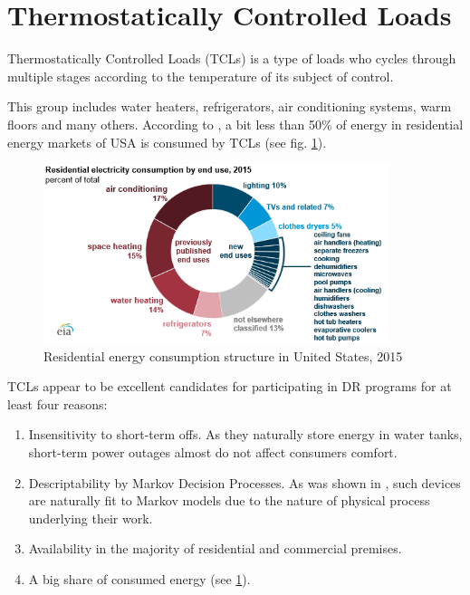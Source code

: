 \section{Thermostatically Controlled Loads}

\begin{definition}
    Thermostatically Controlled Loads (TCLs) is a type of loads who cycles through multiple stages according to the temperature of its subject of control.
\end{definition}
 This group includes water heaters, refrigerators, air conditioning systems, warm floors and many others. According to \cite{EIA2009}, a bit less than 50\% of energy in residential energy markets of USA is consumed by TCLs (see fig. \ref{fig:energy_consumption_in_usa}).

\begin{figure}
    \centering
    \label{fig:energy_consumption_in_usa}
    \includegraphics[width=0.9\textwidth]{figures/energy_consumption_in_usa}
    \caption{Residential energy consumption structure in United States, 2015}
\end{figure}

TCLs appear to be excellent candidates for participating in DR programs for at least four reasons:

\begin{enumerate}
    \item Insensitivity to short-term offs. As they naturally store energy in water tanks, short-term power outages almost do not affect consumers comfort.
    \item Descriptability by Markov Decision Processes. As was shown in \cite{Taylor2014, Chertkov2017}, such devices are naturally fit to Markov models due to the nature of physical process underlying their work.
    \item Availability in the majority of residential and commercial premises. 
    \item A big share of consumed energy (see \ref{fig:energy_consumption_in_usa}).
\end{enumerate}
